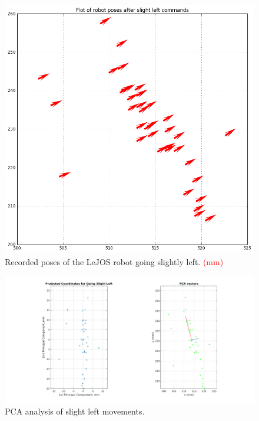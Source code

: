 \documentclass[paper=a4, fontsize=11pt]{scrartcl} %
\begin{document}
    \begin{figure}[h!]
        \begin{center}
            \setlength{\fboxsep}{0.5pt} %
            \setlength{\fboxrule}{0.5pt}
            \includegraphics[width=0.7\linewidth,fbox]{images/poses_plot_2_slightLeft.png}
            \caption{Recorded poses of the LeJOS robot going slightly left. \textcolor{red}{(mm)}}
        \end{center}
    \end{figure}

    \begin{figure}[h!]
        \begin{center}
            \setlength{\fboxsep}{0.5pt} %
            \setlength{\fboxrule}{0.5pt}
            \includegraphics[width=\linewidth,fbox]{images/pca_slightLeft.png}
            \caption{PCA analysis of slight left movements.}
        \end{center}
    \end{figure}
\end{document}
